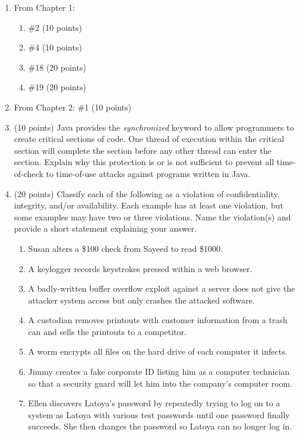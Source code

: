 \documentclass[letterpaper]{article}
\begin{document}
\begin{enumerate}

\item From Chapter 1:
  \begin{enumerate}
  \item \#2 (10 points)
  \item \#4 (10 points)
  \item \#18 (20 points)
  \item \#19 (20 points)
  \end{enumerate}

\item From Chapter 2: \#1 (10 points)

\item (10 points) Java provides the {\em synchronized} keyword to allow programmers to create critical sections of code. One thread of execution within the critical section will complete the section before any other thread can enter the section. Explain why this protection is or is not sufficient to prevent all time-of-check to time-of-use attacks against programs written in Java.

\item (20 points) Classify each of the following as a violation of confidentiality, integrity, and/or availability. Each example has at least one violation, but some examples may have two or three violations. Name the violation(s) and provide a short statement explaining your answer.
  \begin{enumerate}
  \item Susan alters a \$100 check from Sayeed to read \$1000.
  \item A keylogger records keystrokes pressed within a web browser.
  \item A badly-written buffer overflow exploit against a server does not give the attacker system access but only crashes the attacked software.
  \item A custodian removes printouts with customer information from a trash can and sells the printouts to a competitor.
  \item A worm encrypts all files on the hard drive of each computer it infects.
  \item Jimmy creates a fake corporate ID listing him as a computer technician so that a security guard will let him into the company’s computer room.
  \item Ellen discovers Latoya’s password by repeatedly trying to log on to a system as Latoya with various test passwords until one password finally succeeds. She then changes the password so Latoya can no longer log in.
  \end{enumerate}

\end{enumerate}
\end{document}
